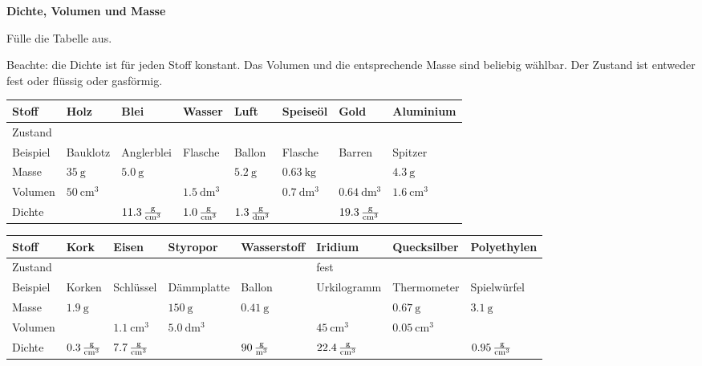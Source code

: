 \documentclass[a4paper]{article}
\begin{document}
{\bf Dichte, Volumen und Masse}

\begin{enumerate}[1.]
{\bf \item Fülle die Tabelle aus.} Beachte: die Dichte ist für jeden Stoff konstant. Das Volumen und die entsprechende Masse sind beliebig wählbar. Der Zustand ist entweder fest oder flüssig oder gasförmig. 

\renewcommand{\arraystretch}{2}
\begin{tabular}{|p{1.7 cm}|p{1.7 cm}|p{1.7 cm}|p{1.7 cm}|p{1.7 cm}|p{1.7 cm}|p{1.7 cm}|p{1.7 cm}|}
\hline
Stoff	& Holz & Blei & Wasser & Luft & Speiseöl & Gold & Aluminium \\
\hline 
Zustand &  &  &  &  &  &  &  \\
\hline
Beispiel & Bauklotz & Anglerblei & Flasche & Ballon & Flasche & Barren & Spitzer\\
\hline
Masse & $\SI{35}{\gram}$  & $\SI{5,0}{\gram}$  &  & $\SI{5,2}{\gram}$  & $\SI{0,63}{\kilogram}$  &  &$\SI{4,3}{\gram}$  \\
\hline
Volumen &$\SI{50}{\centi\meter^3}$  &  &$\SI{1,5}{\deci\meter^3}$  &  & $\SI{0.7}{\deci\meter^3 }$  &$\SI{0,64}{\deci\meter^3}$  & $\SI{1,6}{\centi\meter^3}$  \\
\hline
Dichte & &$\SI{11,3}{\gram\over{\centi\meter^3}}$  &$\SI{1,0}{\gram\over{\centi\meter^3}}$  &$\SI{1.3}{\gram\over{\deci\meter^3}}$  &   &$\SI{19,3}{\gram\over{\centi\meter^3}}$  &  \\
\hline
\end{tabular}
\vspace{0.5 cm}

\begin{tabular}{|p{1.4 cm}|p{1.4 cm}|p{1.5 cm}|p{1.8 cm}|p{1.7 cm}|p{2.0 cm}|p{2.1 cm}|p{1.7 cm}|}
\hline
Stoff	& Kork & Eisen & Styropor & Wasserstoff & Iridium & Quecksilber & Polyethylen \\
\hline
Zustand &  &  &  &  & fest &  &  \\
\hline 
Beispiel & Korken & Schlüssel & Dämmplatte & Ballon & Urkilogramm & Thermometer & Spielwürfel\\
\hline
Masse &$\SI{1,9}{\gram}$  &  & $\SI{150}{\gram}$  & $\SI{0,41}{\gram}$  &  & $\SI{0,67}{\gram}$ & $\SI{3,1}{\gram}$\\
\hline
Volumen & & $\SI{1,1}{\centi\meter^3}$  & $\SI{5,0}{\deci\meter^3}$  &  & $\SI{45}{\centi\meter^3}$  &$\SI{0,05}{\centi\meter^3}$  & \\
\hline
Dichte &$\SI{0,3}{\gram\over{\centi\meter^3}}$  &$\SI{7,7}{\gram\over{\centi\meter^3}}$  &  &$\SI{90}{\gram\over{\meter^3}}$  &$\SI{22,4}{\gram\over{\centi\meter^3}}$  &  &$\SI{0,95}{\gram\over{\centi\meter^3}}$  \\
\hline
\end{tabular}


\end{enumerate}
\end{document}
